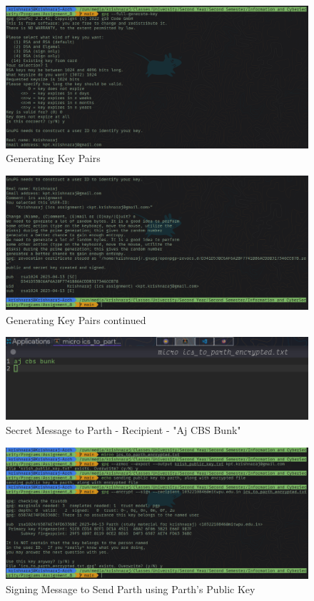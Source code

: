 \documentclass[11pt]{article}
\begin{document}
\begin{figure}[H]
    \centering
    \includegraphics[width=1\textwidth]{../Programs/Assignment_8/Screenshot_on_2023-04-13_at_12-28-59.png}
    \caption{Generating Key Pairs}
\end{figure}
\begin{figure}[H]
    \centering
    \includegraphics[width=.99\textwidth]{../Programs/Assignment_8/Screenshot_on_2023-04-13_at_12-29-06.png}
    \caption{Generating Key Pairs continued}
\end{figure}
\begin{figure}[H]
    \centering
    \includegraphics[width=.99\textwidth]{../Programs/Assignment_8/Screenshot_on_2023-04-13_at_12-29-34.png}
    \caption{Secret Message to Parth - Recipient - "Aj CBS Bunk"}
\end{figure}
\begin{figure}[H]
    \centering
    \includegraphics[width=.99\textwidth]{../Programs/Assignment_8/Screenshot_on_2023-04-13_at_12-31-43.png}
    \caption{Signing Message to Send Parth using Parth's Public Key}
\end{figure}
\end{document}
